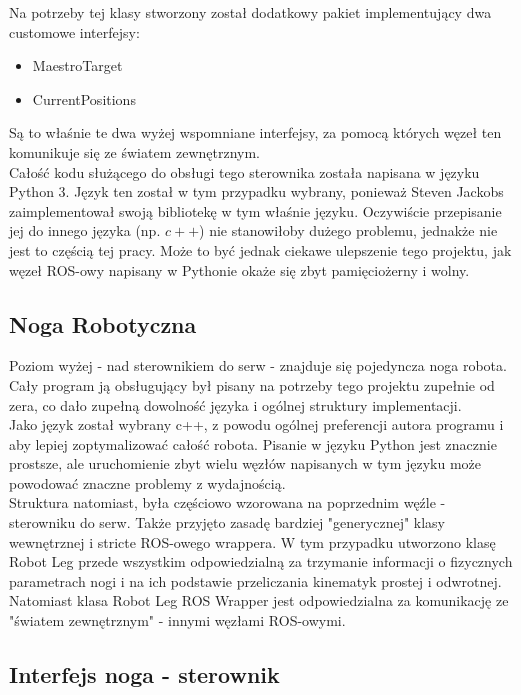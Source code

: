 \documentclass[a4paper,13pt]{article}
\begin{document}
Na potrzeby tej klasy stworzony został dodatkowy pakiet implementujący dwa customowe interfejsy:
\begin{itemize}
\item MaestroTarget
\item CurrentPositions
\end{itemize}

Są to właśnie te dwa wyżej wspomniane interfejsy, za pomocą których węzeł ten komunikuje się ze światem zewnętrznym.\\

Całość kodu służącego do obsługi tego sterownika została napisana w języku Python 3. Język ten został w tym przypadku wybrany, ponieważ Steven Jackobs zaimplementował swoją bibliotekę w tym właśnie języku. Oczywiście przepisanie jej do innego języka (np. $c++$) nie stanowiłoby dużego problemu, jednakże nie jest to częścią tej pracy. Może to być jednak ciekawe ulepszenie tego projektu, jak węzeł ROS-owy napisany w Pythonie okaże się zbyt pamięciożerny i wolny.
\subsection{Noga Robotyczna}
Poziom wyżej - nad sterownikiem do serw - znajduje się pojedyncza noga robota. Cały program ją obsługujący był pisany na potrzeby tego projektu zupełnie od zera, co dało zupełną dowolność języka i ogólnej struktury implementacji. \\

Jako język został wybrany c++, z powodu ogólnej preferencji autora programu i aby lepiej zoptymalizować całość robota. Pisanie w języku Python jest znacznie prostsze, ale uruchomienie zbyt wielu węzłów napisanych w tym języku może powodować znaczne problemy z wydajnością.\\

Struktura natomiast, była częściowo wzorowana na poprzednim węźle - sterowniku do serw. Także przyjęto zasadę bardziej "generycznej" klasy wewnętrznej i stricte ROS-owego wrappera. W tym przypadku utworzono klasę Robot Leg przede wszystkim odpowiedzialną za trzymanie informacji o fizycznych parametrach nogi i na ich podstawie przeliczania kinematyk prostej i odwrotnej. Natomiast klasa Robot Leg ROS Wrapper jest odpowiedzialna za komunikację ze "światem zewnętrznym" - innymi węzłami ROS-owymi.

\subsection{Interfejs noga - sterownik}
\end{document}
